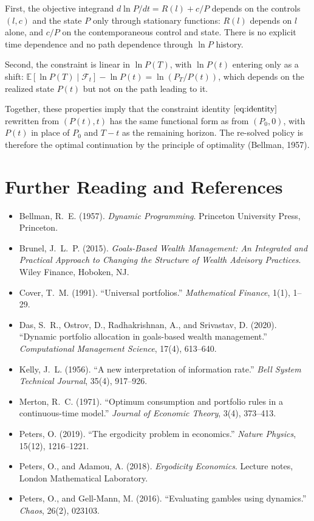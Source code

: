 \documentclass[11pt]{article}
\begin{document}
First, the objective integrand $d\ln P/dt = R(l) + c/P$ depends on
the controls $(l, c)$ and the state $P$ only through stationary
functions: $R(l)$ depends on $l$ alone, and $c/P$ on the
contemporaneous control and state. There is no explicit time
dependence and no path dependence through $\ln P$ history.

Second, the constraint is linear in $\ln P(T)$, with $\ln P(t)$
entering only as a shift: $\mathbb{E}[\ln P(T) \mid \mathcal{F}_t] -
\ln P(t) = \ln(P_T/P(t))$, which depends on the realized state $P(t)$
but not on the path leading to it.

Together, these properties imply that the constraint identity
$\eqref{eq:identity}$ rewritten from $(P(t), t)$ has the same
functional form as from $(P_0, 0)$, with $P(t)$ in place of $P_0$ and
$T - t$ as the remaining horizon. The re-solved policy is therefore
the optimal continuation by the principle of optimality (Bellman,
1957).

\newpage
\section{Further Reading and References}

\begin{itemize}\setlength{\itemsep}{0.3em}
  \item Bellman, R.~E. (1957). \textit{Dynamic Programming}. Princeton
        University Press, Princeton.
  \item Brunel, J.~L.~P. (2015). \textit{Goals-Based Wealth Management:
        An Integrated and Practical Approach to Changing the Structure of
        Wealth Advisory Practices}. Wiley Finance, Hoboken, NJ.
  \item Cover, T.~M. (1991). ``Universal portfolios.''
        \textit{Mathematical Finance}, 1(1), 1--29.
  \item Das, S.~R., Ostrov, D., Radhakrishnan, A., and Srivastav, D.
        (2020). ``Dynamic portfolio allocation in goals-based wealth
        management.'' \textit{Computational Management Science}, 17(4),
        613--640.
  \item Kelly, J.~L. (1956). ``A new interpretation of information
        rate.'' \textit{Bell System Technical Journal}, 35(4), 917--926.
  \item Merton, R.~C. (1971). ``Optimum consumption and portfolio rules
        in a continuous-time model.'' \textit{Journal of Economic
        Theory}, 3(4), 373--413.
  \item Peters, O. (2019). ``The ergodicity problem in economics.''
        \textit{Nature Physics}, 15(12), 1216--1221.
  \item Peters, O., and Adamou, A. (2018). \textit{Ergodicity
        Economics}. Lecture notes, London Mathematical Laboratory.
  \item Peters, O., and Gell-Mann, M. (2016). ``Evaluating gambles
        using dynamics.'' \textit{Chaos}, 26(2), 023103.
\end{itemize}
\end{document}
